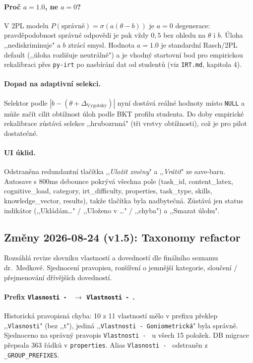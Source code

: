 \documentclass[11pt,a4paper]{article}
\begin{document}
\paragraph{Proč $a = 1.0$, ne $a = 0$?} V 2PL modelu $P(\text{správně}) = \sigma(a(\theta - b))$ je $a = 0$ degenerace: pravděpodobnost správné odpovědi je pak vždy $0{,}5$ bez ohledu na $\theta$ i $b$. Úloha ,,nediskriminuje" a $b$ ztrácí smysl. Hodnota $a = 1.0$ je standardní Rasch/2PL default (,,úloha rozlišuje neutrálně") a je vhodný startovní bod pro empirickou rekalibraci přes \texttt{py-irt} po nasbírání dat od studentů (viz \texttt{IRT.md}, kapitola 4).

\paragraph{Dopad na adaptivní selekci.} Selektor podle $|b - (\theta + \Delta_{\text{Vygotsky}})|$ nyní dostává reálné hodnoty místo \texttt{NULL} a může začít cílit obtížnost úloh podle BKT profilu studenta. Do doby empirické rekalibrace zůstává selekce ,,hrubozrnná" (tři vrstvy obtížnosti), což je pro pilot dostatečné.

\paragraph{UI úklid.} Odstraněna redundantní tlačítka ,,\emph{Uložit změny}" a ,,\emph{Vrátit}" ze save-baru. Autosave s 800ms debounce pokrývá všechna pole (task\_id, content\_latex, cognitive\_load, category, irt\_difficulty, properties, task\_type, skills, knowledge\_vector, results), takže tlačítka byla nadbytečná. Zůstává jen status indikátor (,,Ukládám\ldots" / ,,Uloženo v \ldots" / ,,chyba") a ,,Smazat úlohu".

\subsection{Změny 2026-08-24 (v1.5): Taxonomy refactor}

Rozsáhlá revize slovníku vlastností a dovedností dle finálního seznamu dr.~Medkové. Sjednocení pravopisu, rozšíření o jemnější kategorie, sloučení / přejmenování dřívějších dovedností.

\paragraph{Prefix \texttt{Vlasnosti - } $\rightarrow$ \texttt{Vlastnosti - }.} Historická pravopisná chyba: 10 z 11 vlastností mělo v prefixu překlep ,,\texttt{Vlasnosti}" (bez ,,t"), jediná ,,\texttt{Vlastnosti - Goniometrická}" byla správně. Sjednoceno na správný pravopis \texttt{Vlastnosti - } u všech 15 položek. DB migrace přepsala 363 řádků v \texttt{properties}. Alias \texttt{Vlasnosti - } odstraněn z \texttt{\_GROUP\_PREFIXES}.
\end{document}
